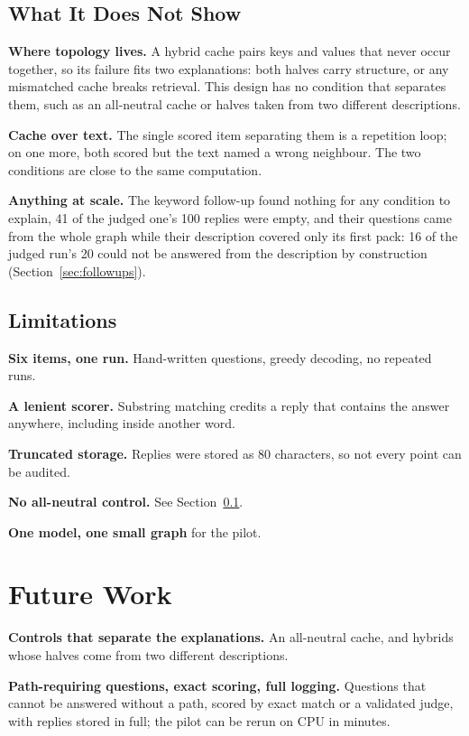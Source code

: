 \documentclass[11pt,a4paper]{article}
\begin{document}
\subsection{What It Does Not Show}
\label{sec:notshow}

\textbf{Where topology lives.} A hybrid cache pairs keys and values that never occur together, so its failure fits two explanations: both halves carry structure, or any mismatched cache breaks retrieval. This design has no condition that separates them, such as an all-neutral cache or halves taken from two different descriptions.

\textbf{Cache over text.} The single scored item separating them is a repetition loop; on one more, both scored but the text named a wrong neighbour. The two conditions are close to the same computation.

\textbf{Anything at scale.} The keyword follow-up found nothing for any condition to explain, 41 of the judged one's 100 replies were empty, and their questions came from the whole graph while their description covered only its first pack: 16 of the judged run's 20 could not be answered from the description by construction (Section~\ref{sec:followups}).

\subsection{Limitations}
\label{sec:limits}

\textbf{Six items, one run.} Hand-written questions, greedy decoding, no repeated runs.

\textbf{A lenient scorer.} Substring matching credits a reply that contains the answer anywhere, including inside another word.

\textbf{Truncated storage.} Replies were stored as 80 characters, so not every point can be audited.

\textbf{No all-neutral control.} See Section~\ref{sec:notshow}.

\textbf{One model, one small graph} for the pilot.

\section{Future Work}

\textbf{Controls that separate the explanations.} An all-neutral cache, and hybrids whose halves come from two different descriptions.

\textbf{Path-requiring questions, exact scoring, full logging.} Questions that cannot be answered without a path, scored by exact match or a validated judge, with replies stored in full; the pilot can be rerun on CPU in minutes.
\end{document}
